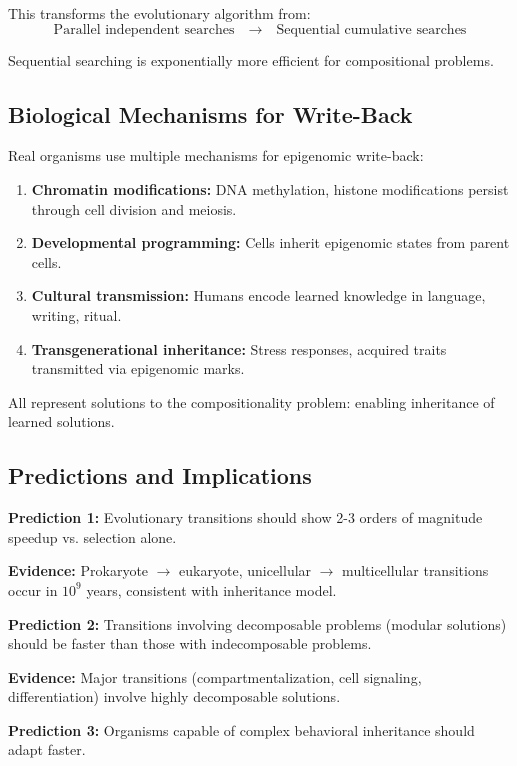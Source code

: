 \documentclass[11pt]{article}
\theoremstyle{definition}
\begin{document}
This transforms the evolutionary algorithm from:
$$\text{Parallel independent searches} \quad \to \quad \text{Sequential cumulative searches}$$

Sequential searching is exponentially more efficient for compositional problems.

\subsection{Biological Mechanisms for Write-Back}

Real organisms use multiple mechanisms for epigenomic write-back:

\begin{enumerate}
\item \textbf{Chromatin modifications:} DNA methylation, histone modifications persist through cell division and meiosis.
\item \textbf{Developmental programming:} Cells inherit epigenomic states from parent cells.
\item \textbf{Cultural transmission:} Humans encode learned knowledge in language, writing, ritual.
\item \textbf{Transgenerational inheritance:} Stress responses, acquired traits transmitted via epigenomic marks.
\end{enumerate}

All represent solutions to the compositionality problem: enabling inheritance of learned solutions.

\subsection{Predictions and Implications}

\textbf{Prediction 1:} Evolutionary transitions should show 2-3 orders of magnitude speedup vs. selection alone.

\textbf{Evidence:} Prokaryote $\to$ eukaryote, unicellular $\to$ multicellular transitions occur in $10^9$ years, consistent with inheritance model.

\textbf{Prediction 2:} Transitions involving decomposable problems (modular solutions) should be faster than those with indecomposable problems.

\textbf{Evidence:} Major transitions (compartmentalization, cell signaling, differentiation) involve highly decomposable solutions.

\textbf{Prediction 3:} Organisms capable of complex behavioral inheritance should adapt faster.
\end{document}
